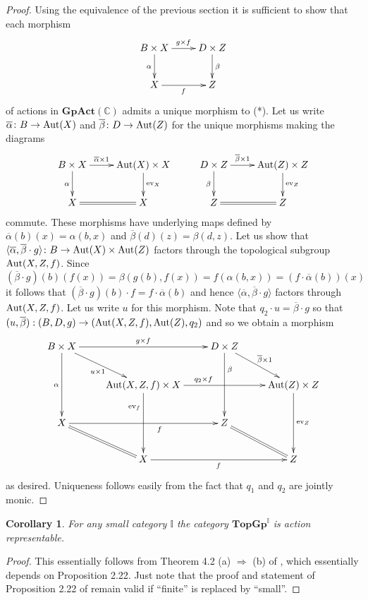 \documentclass{article}
\newcommand{\C}{\mathbb{C}}
\newcommand{\I}{\mathbb{I}}
\newcommand{\Aut}{\textnormal{Aut}}
\newcommand{\TopGp}{\mathbf{TopGp}}
\newcommand{\GpAct}{\mathbf{GpAct}}
\newcommand{\ev}{\textnormal{ev}}
\newtheorem{corollary}[theorem]{Corollary}
\begin{document}
\begin{proof}
Using the equivalence of the previous section it is sufficient to show that
each morphism
\[
\xymatrix{
B\times X
\ar[d]_{\alpha}
\ar[r]^{g\times f}
&
D\times Z
\ar[d]^{\beta}
\\
X\ar[r]_{f} & Z
}
\]
of actions in $\GpAct(\C)$ admits a unique morphism to (*).
Let us write $\overline{\alpha}\colon B \to \Aut(X)$ and $\overline{\beta}\colon D\to \Aut(Z)$ for
the unique morphisms making the diagrams
\[
\xymatrix{
B\times X
\ar[d]_{\alpha}
\ar[r]^-{\overline{\alpha}\times 1}
&
\Aut(X)\times X
\ar[d]^{\ev_X}
&
D\times Z
\ar[d]_{\beta}
\ar[r]^-{\overline{\beta} \times 1}
&
\Aut(Z)\times Z
\ar[d]^{\ev_Z}
\\
X
\ar@{=}[r]
&
X
&
Z
\ar@{=}[r]
&
Z
}
\]
commute.
These morphisms have underlying maps defined by $\overline{\alpha}(b)(x)=\alpha(b,x)$
and $\overline{\beta}(d)(z)=\beta(d,z)$. Let us show that
$\langle \overline{\alpha}, \overline{\beta} \cdot g \rangle \colon B \to \Aut(X)\times \Aut(Z)$ factors through the
topological subgroup $\Aut(X,Z,f)$.
Since
\[
(\overline{\beta} \cdot g)(b)(f(x))=\beta(g(b),f(x))=f(\alpha(b,x))=(f\cdot \overline{\alpha}(b))(x)
\]
it follows that $(\overline{\beta} \cdot g)(b) \cdot f = f \cdot \overline{\alpha}(b)$ and hence
$\langle \overline{\alpha}, \overline{\beta} \cdot g \rangle$ factors through $\Aut(X,Z,f)$. Let
us write $u$ for this morphism. Note that $q_2\cdot u = \overline{\beta} \cdot g$
so that $(u,\overline{\beta}) : (B,D,g) \to (\Aut(X,Z,f),\Aut(Z),q_2)$
and so we obtain a morphism
\[
\xymatrix{
B\times X
\ar[dd]_{\alpha}
\ar[rr]^{g\times f}
\ar[rd]_{u\times 1}
&
&
D\times Z
\ar[dd]^(0.3){\beta}
\ar[rd]^{\overline{\beta} \times 1}
\\
&
\Aut(X,Z,f)\times X
\ar[dd]_(0.3){\ev_f}
\ar[rr]^(0.4){q_2\times f}
&
&
\Aut(Z)\times Z
\ar[dd]^{\ev_Z}
\\
X
\ar[rr]_(0.6){f}
\ar@{=}[rd]
&
&
Z
\ar@{=}[rd]
\\
&
X
\ar[rr]_{f}
&
&
Z
}
\]
as desired. Uniqueness follows easily from the fact that $q_1$ and $q_2$ are jointly monic.
\end{proof}

\begin{corollary}
For any small category $\I$ the category $\TopGp^\I$ is action representable.
\end{corollary}
\begin{proof}
This essentially follows from Theorem 4.2 (a) $\Rightarrow$ (b) of \cite{GRAY:2017},
which essentially depends on Proposition 2.22. Just note that
the proof and statement of Proposition 2.22 of \cite{GRAY:2017} remain
valid if ``finite'' is replaced by ``small''.
\end{proof}
\end{document}
